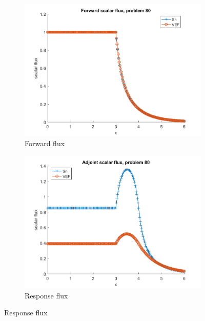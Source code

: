 \documentclass{article}
\begin{document}
\begin{figure}[H]
\label{Case80Flux}
\centering
\begin{subfigure}{.5\textwidth}
  \centering
  \includegraphics[width=.98\linewidth]{IanProposal/figures2/80phi.png}
  \caption{Forward flux}
  \label{fig:sfig1}
\end{subfigure}%
\begin{subfigure}{.5\textwidth}
  \centering
  \includegraphics[width=.98\linewidth]{IanProposal/figures2/80phia.png}
  \caption{Response flux}
  \label{fig:sfig4}
\end{subfigure}%
\end{figure}
\end{document}
